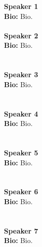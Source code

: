 \textbf{Speaker 1}\\
\textbf{Bio:} Bio.\\
\\
\textbf{Speaker 2}\\
\textbf{Bio:} Bio.\\\\
\\
\textbf{Speaker 3}\\
\textbf{Bio:} Bio.\\\\
\\
\textbf{Speaker 4}\\
\textbf{Bio:} Bio.\\\\
\\
\textbf{Speaker 5}\\
\textbf{Bio:} Bio.\\\\
\\
\textbf{Speaker 6}\\
\textbf{Bio:} Bio.\\\\
\\
\textbf{Speaker 7}\\
\textbf{Bio:} Bio.\\\clearpage
